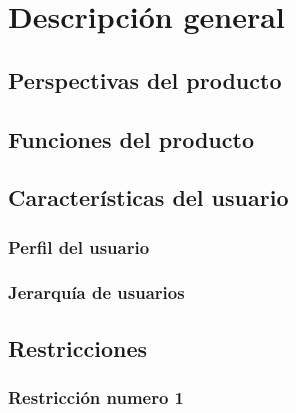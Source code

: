 \chapter{Descripción general}

\section{Perspectivas del producto}

\section{Funciones del producto}

\section{Características del usuario}

    \subsection{Perfil del usuario}

    \subsection{Jerarquía de usuarios}

\section{Restricciones}

    \subsection{Restricción numero 1}
